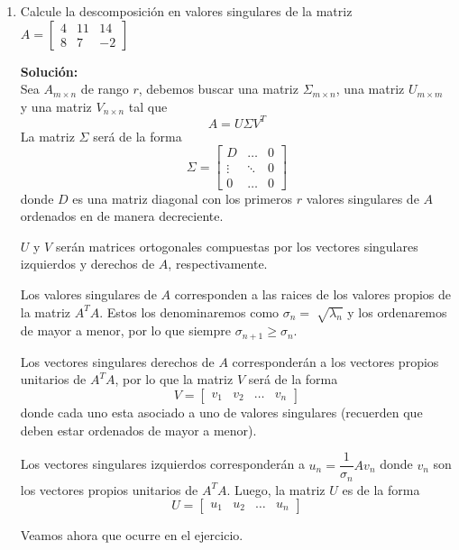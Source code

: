 \documentclass[12pt]{article}
\newenvironment{solucion}
{\begin{mdframed}[backgroundcolor=black!10]
		{\bf Solución:}\\
	}
	{
	\end{mdframed}
}
\newenvironment{preguntas}
{\begin{enumerate}\itemsep12pt
	}
	{
	\end{enumerate}
}
\begin{document}
\begin{preguntas}
\begin{solucion}
\begin{enumerate}[a)]
Obtenemos la forma cuadrática
$$Q(y) = y^TDy = y_1^2$$
Que no tiene productos cruzados.
\end{enumerate}
\end{solucion}
\item Calcule la descomposición en valores singulares de la matriz $A = \begin{bmatrix}4 & 11 & 14\\ 8 & 7 & -2\end{bmatrix}$
\begin{solucion}
Sea $A_{m \times n}$ de rango $r$, debemos buscar una matriz $\Sigma_{m \times n}$, una matriz $U_{m \times m}$ y una matriz $V_{n \times n}$ tal que
		$$A = U \Sigma V^T$$
		La matriz $\Sigma$ será de la forma
		$$\Sigma = \begin{bmatrix}
		D & \dots & 0\\
		\vdots & \ddots & 0\\
		0 & \dots & 0
		\end{bmatrix}$$
		donde $D$ es una matriz diagonal con los primeros $r$ valores singulares de $A$ ordenados en de manera decreciente.
		
		$U$ y $V$ serán matrices ortogonales compuestas por los vectores singulares izquierdos y derechos de $A$, respectivamente.
		
		Los valores singulares de $A$ corresponden a las raices de los valores propios de la matriz $A^TA$. Estos los denominaremos como $\sigma_n = \sqrt[]{\lambda_n}$ y los ordenaremos de mayor a menor, por lo que siempre $\sigma_{n+1} \geq \sigma_n$.
		
		Los vectores singulares derechos de $A$ corresponderán a los vectores propios unitarios de $A^TA$, por lo que la matriz $V$ será de la forma 
		$$V = \begin{bmatrix}
		v_1 & v_2 & \dots & v_n
		\end{bmatrix}$$
		donde cada uno esta asociado a uno de valores singulares (recuerden que deben estar ordenados de mayor a menor).
		
		Los vectores singulares izquierdos corresponderán a $u_n = \dfrac{1}{\sigma_n}Av_n$ donde $v_n$ son los vectores propios unitarios de $A^TA$. Luego, la matriz $U$ es de la forma
		$$U = \begin{bmatrix}
		u_1 & u_2 & \dots & u_n
		\end{bmatrix}$$
		
		Veamos ahora que ocurre en el ejercicio.
		

\end{solucion}
\end{preguntas}
\end{document}

